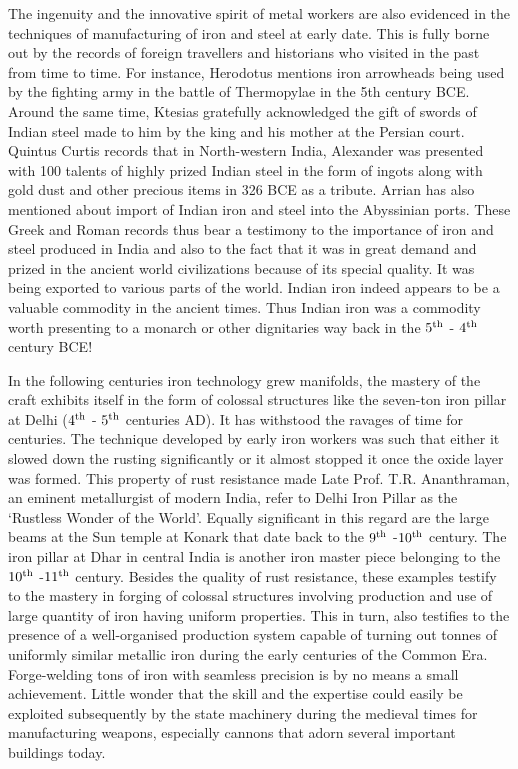 The ingenuity and the innovative spirit of metal workers are also evidenced in the techniques of manufacturing of iron and steel at early date. This is fully borne out by the records of foreign travellers and historians who visited in the past from time to time. For instance, Herodotus mentions iron arrowheads being used by the fighting army in the battle of Thermopylae in the 5th century BCE. Around the same time, Ktesias gratefully acknowledged the gift of swords of Indian steel made to him by the king and his mother at the Persian court. Quintus Curtis records that in North-western India, Alexander was presented with 100 talents of highly prized Indian steel in the form of ingots along with gold dust and other precious items in 326 BCE as a tribute. Arrian has also mentioned about import of Indian iron and steel into the Abyssinian ports. These Greek and Roman records thus bear a testimony to the importance of iron and steel produced in India and also to the fact that it was in great demand and prized in the ancient world civilizations because of its special quality. It was being exported to various parts of the world. Indian iron indeed appears to be a valuable commodity in the ancient times. Thus Indian iron was a commodity worth presenting to a monarch or other dignitaries way back in the $5^{\rm th}$ - $4^{\rm th}$ century BCE! 

In the following centuries iron technology grew manifolds, the mastery of the craft exhibits itself in the form of colossal structures like the seven-ton iron pillar at Delhi ($4^{\rm th}$ - $5^{\rm th}$ centuries AD). It has withstood the ravages of time for centuries. The technique developed by early iron workers was such that either it slowed down the rusting significantly or it almost stopped it once the oxide layer was formed. This property of rust resistance made Late Prof. T.R. Ananthraman, an eminent metallurgist of modern India, refer to Delhi Iron Pillar as the ‘Rustless Wonder of the World’. Equally significant in this regard are the large beams at the Sun temple at Konark that date back to the $9^{\rm th}$ -$10^{\rm th}$ century. The iron pillar at Dhar in central India is another iron master piece belonging to the $10^{\rm th}$ -$11^{\rm th}$ century. Besides the quality of rust resistance, these examples testify to the mastery in forging of colossal structures involving production and use of large quantity of iron having uniform properties. This in turn, also testifies to the presence of a well-organised production system capable of turning out tonnes of uniformly similar metallic iron during the early centuries of the Common Era. Forge-welding tons of iron with seamless precision is by no means a small achievement.  Little wonder that the skill and the expertise could easily be exploited subsequently by the state machinery during the medieval times for manufacturing weapons, especially cannons that adorn several important buildings today.

